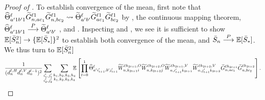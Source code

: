 \begin{proof}[Proof of ]
    To establish convergence of the mean, first note that
    $
        \widehat{\Theta}_{
            a' 1 b' 1
        }^{\ell}
        \widetilde{G}_{n, a c_1}^{\ell 1}
        \widetilde{G}_{n, b c_2}^{\ell 1}
        \rightsquigarrow
        \widetilde{\Theta}_{
            a' b'
        }^{\ell}
        \widetilde{G}_{a c_1}^{\ell 1}
        \widetilde{G}_{b c_2}^{\ell 1}
    $
    by , the continuous mapping theorem,
    $
        \widehat{\Theta}_{
            a' 1 b' 1
        }^{\ell}
        \overset{P}{\longrightarrow}
        \widetilde{\Theta}_{
            a' b'
        }^{\ell}
    $ \citep{yang2019v2}, and .
    Inspecting  and , we see it is sufficient to show $\operatorname*{\mathbb{E}} [ \bar{S}_{n}^2 ] \to \{ \operatorname*{\mathbb{E}} [ \bar{S}_{*} ] \}^2$ to establish both convergence of the mean, and $\bar{S}_{n} \overset{P}{\longrightarrow} \operatorname*{\mathbb{E}} [ \bar{S}_{*} ]$.
    We thus turn to $\operatorname*{\mathbb{E}} [\bar{S}_{n}^2]$
    \begin{align*}
        \frac{1}{(
            d_{n}^{\ell, H} d_{n}^{\ell, V} d_{n}^{\ell - 1}
        )^2}
        \sum_{\substack{i'_1, j'_1\\ i'_2, j'_2}}
        \sum_{\substack{h_1, h_2, h_3, h_4\\ k_1, k_2, k_3, k_4}}
            \! \! \! \!
            \operatorname*{\mathbb{E}} \left[
                \prod_{t=0}^1
                    \widehat{\Theta}_{
                        a' i'_{t+1} ,
                        b' j'_{t+1}
                    }^{\ell}
                    \widetilde{W}_{n , k_{2t + 1} i}^{\ell h_{2t + 1} , O}
                    \widetilde{W}_{n , k_{2t + 2} j}^{\ell h_{2t + 2} , O}
                    \widetilde{W}_{n, i'_{t + 1} k_{2t + 1}}^{\ell h_{2t + 1}, V}
                    \widetilde{W}_{n, j'_{t + 1} k_{2t + 2}}^{\ell h_{2t + 2}, V}
                    \widetilde{G}_{n, a c_1}^{\ell h_{2t + 1}}
                    \widetilde{G}_{n, b c_2}^{\ell h_{2t + 2}}
            \right]
        .
    \end{align*}

\end{proof}
